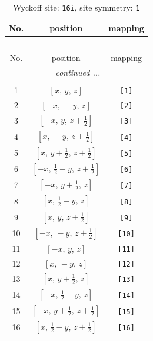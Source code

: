\documentclass[fleqn,8pt]{jsarticle}
\begin{document}
\begin{longtable}{ccc}
\caption{Wyckoff site: {\tt 16i}, site symmetry: {\tt 1}}
 \\
 \hline \hline
No. & position & mapping \\ \hline \endfirsthead

\multicolumn{2}{l}{\tablename\ \thetable{}} \\
 \hline \hline
No. & position & mapping \\ \hline \endhead

 \hline \hline
\multicolumn{2}{r}{\footnotesize\it continued ...} \\ \endfoot

 \hline \hline
\multicolumn{2}{r}{} \\ \endlastfoot

1 & $\left[ x,\, y,\, z \right]$ & {\tt [1]} \\ \hline
2 & $\left[ - x,\, - y,\, z \right]$ & {\tt [2]} \\ \hline
3 & $\left[ - x,\, y,\, z + \frac{1}{2} \right]$ & {\tt [3]} \\ \hline
4 & $\left[ x,\, - y,\, z + \frac{1}{2} \right]$ & {\tt [4]} \\ \hline
5 & $\left[ x,\, y + \frac{1}{2},\, z + \frac{1}{2} \right]$ & {\tt [5]} \\ \hline
6 & $\left[ - x,\, \frac{1}{2} - y,\, z + \frac{1}{2} \right]$ & {\tt [6]} \\ \hline
7 & $\left[ - x,\, y + \frac{1}{2},\, z \right]$ & {\tt [7]} \\ \hline
8 & $\left[ x,\, \frac{1}{2} - y,\, z \right]$ & {\tt [8]} \\ \hline
9 & $\left[ x,\, y,\, z + \frac{1}{2} \right]$ & {\tt [9]} \\ \hline
10 & $\left[ - x,\, - y,\, z + \frac{1}{2} \right]$ & {\tt [10]} \\ \hline
11 & $\left[ - x,\, y,\, z \right]$ & {\tt [11]} \\ \hline
12 & $\left[ x,\, - y,\, z \right]$ & {\tt [12]} \\ \hline
13 & $\left[ x,\, y + \frac{1}{2},\, z \right]$ & {\tt [13]} \\ \hline
14 & $\left[ - x,\, \frac{1}{2} - y,\, z \right]$ & {\tt [14]} \\ \hline
15 & $\left[ - x,\, y + \frac{1}{2},\, z + \frac{1}{2} \right]$ & {\tt [15]} \\ \hline
16 & $\left[ x,\, \frac{1}{2} - y,\, z + \frac{1}{2} \right]$ & {\tt [16]} \\
\end{longtable}
\end{document}
